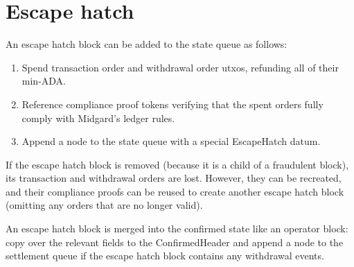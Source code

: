 \documentclass[../midgard.tex]{subfiles}
\begin{document}
\section{Escape hatch}
\label{h:escape-hatch}
\todo

An escape hatch block can be added to the state queue as follows:
\begin{enumerate}
    \item Spend transaction order and withdrawal order utxos, refunding all of their min-ADA.
    \item Reference compliance proof tokens verifying that the spent orders fully comply with Midgard's ledger rules.
    \item Append a node to the state queue with a special EscapeHatch datum.
\end{enumerate}

If the escape hatch block is removed (because it is a child of a fraudulent block), its transaction and withdrawal orders are lost. However, they can be recreated, and their compliance proofs can be reused to create another escape hatch block (omitting any orders that are no longer valid).

An escape hatch block is merged into the confirmed state like an operator block: copy over the relevant fields to the ConfirmedHeader and append a node to the settlement queue if the escape hatch block contains any withdrawal events.
\end{document}
